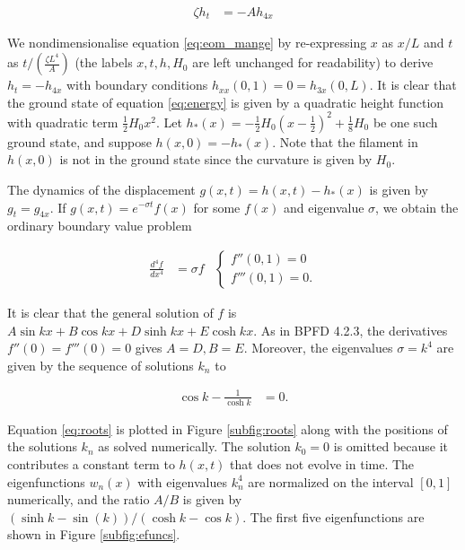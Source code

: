 \documentclass[draft]{article}
\begin{document}
\begin{align}
    \zeta h_t &= -A h_{4x} \label{eq:eom_mange}
\end{align}

We nondimensionalise equation \ref{eq:eom_mange} by re-expressing $x$ as $x/L$ and $t$ as $t / (\frac{\zeta L^4}{A})$ (the labels $x, t, h, H_0$ are left unchanged for readability) to derive $h_t = -h_{4x}$ with boundary conditions $h_{xx}(0, 1) = 0 = h_{3x}(0, L)$. It is clear that the ground state of equation \ref{eq:energy} is given by a quadratic height function with quadratic term $\frac{1}{2}H_0x^2$. Let $h_*(x) = -\frac{1}{2} H_0(x-\frac{1}{2})^2 + \frac{1}{8}H_0$ be one such ground state, and suppose $h(x, 0) = -h_*(x)$. Note that the filament in $h(x, 0)$ is not in the ground state since the curvature is given by $H_0$. 

The dynamics of the displacement $g(x, t) = h(x, t) - h_*(x)$ is given by $g_t = g_{4x}$. If $g(x, t) = e^{-\sigma t} f(x)$ for some $f(x)$ and eigenvalue $\sigma$, we obtain the ordinary boundary value problem 

\begin{align}
    \frac{d^4f}{dx^4} &= \sigma f & \begin{cases} f''(0, 1) = 0 \\ f'''(0, 1) = 0. \end{cases} \label{eq:bvp}
\end{align}

It is clear that the general solution of $f$ is $A \sin kx + B \cos kx + D \sinh kx + E \cosh kx$. As in BPFD 4.2.3, the derivatives $f''(0) = f'''(0) = 0$ gives $A = D, B = E$. Moreover, the eigenvalues $\sigma = k^4$ are given by the sequence of solutions $k_n$ to 

\begin{align}
    \cos k - \frac{1}{\cosh k} &= 0. \label{eq:roots}
\end{align}

Equation \ref{eq:roots} is plotted in Figure \ref{subfig:roots} along with the positions of the solutions $k_n$ as solved numerically. The solution $k_0 = 0$ is omitted because it contributes a constant term to $h(x, t)$ that does not evolve in time. The eigenfunctions $w_n(x)$ with eigenvalues $k_n^4$ are normalized on the interval $[0,1]$ numerically, and the ratio $A/B$ is given by $(\sinh k - \sin(k)) / (\cosh k - \cos k)$. The first five eigenfunctions are shown in Figure \ref{subfig:efuncs}. 
\end{document}
